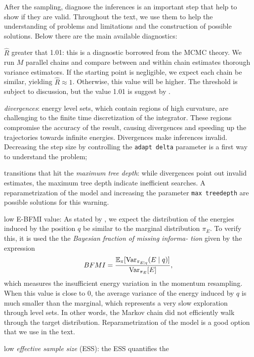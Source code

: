 After the sampling, diagnose the inferences is an important step that help to
show if they are valid. Throughout the text, we use them to help the
understanding of problems and limitations and the construction of possible
solutions. Below there are the main available diagnostics:

\begin{alineas}
  \item $\hat{R}$ greater that 1.01: this is a diagnostic borrowed from the
  MCMC theory. We run $M$ parallel chains and compare between and within chain
  estimates thorough variance estimators. If the starting point is
  negligible, we expect each chain be similar, yielding $\hat{R} \approx 1$.
  Otherwise, this value will be higher. The threshold is subject to
  discussion, but the value 1.01 is suggest by \textcite[p. 4]{vehtari2019rank}.
  \item {\em divergences}: energy level sets, which contain regions of high
  curvature, are challenging to the finite time discretization of the
  integrator. These regions compromise the accuracy of the result, causing
  divergences and speeding up the trajectories towards infinite energies.
  Divergences make inferences invalid. Decreasing the step size by controlling
  the \texttt{adapt delta} parameter is a first way to understand the problem;
  \item transitions that hit the {\em maximum tree depth}: while divergences point
  out invalid estimates, the maximum tree depth indicate inefficient searches.
  A reparametrization of the model and increasing the parameter \texttt{max treedepth} 
  are possible solutions for this warning. 
  \item low E-BFMI value: As stated by \textcite[p.
  6]{betancourt2016diagnosing}, we expect the distribution of the energies
  induced by the position $q$ be similar to the marginal distribution $\pi_E$.
  To verify this, it is used the the {\em Bayesian fraction of missing informa-
  tion} given by the expression 
  $$
  BFMI = \frac{\mathbb{E}_{\pi}[\operatorname{Var}_{\pi_{E \mid q}}(E \mid q)]}{\operatorname{Var}_{\pi_E}[E]},
  $$
  which measures the insufficient energy variation in the momentum resampling.
  When this value is close to $0$, the average variance of the energy induced
  by $q$ is much smaller than the marginal, which represents a very slow
  exploration through level sets. In other words, the Markov chain did not
  efficiently walk through the target distribution. Reparametrization of the
  model is a good option that we use in the text. 
  \item low {\em effective sample size} (ESS): the ESS quantifies the

\end{alineas}
